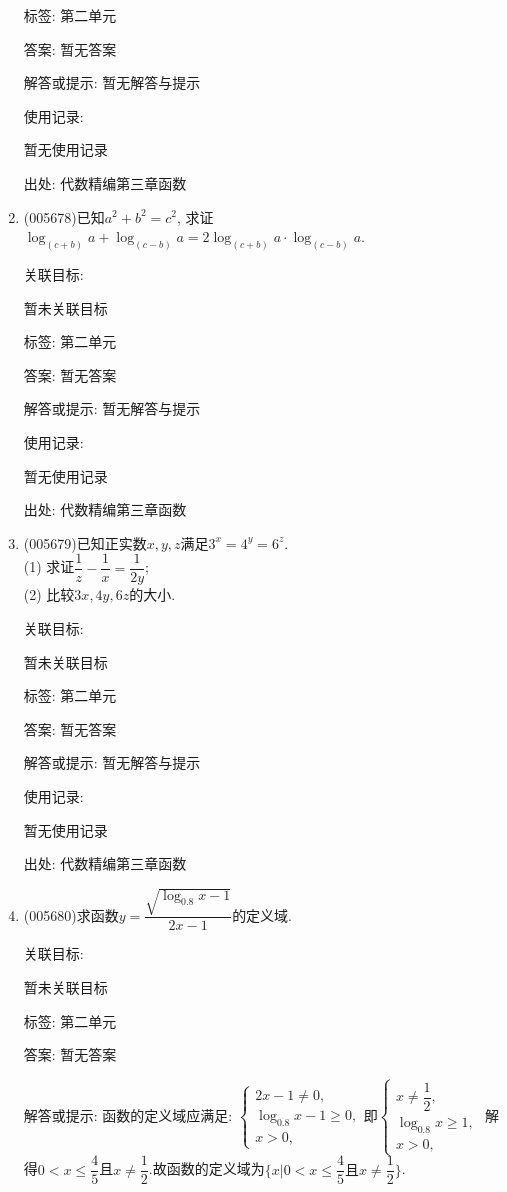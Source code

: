 \documentclass[10pt,a4paper]{article}
\begin{document}
\begin{enumerate}[1.]
标签: 第二单元

答案: 暂无答案

解答或提示: 暂无解答与提示

使用记录:

暂无使用记录


出处: 代数精编第三章函数
\item { (005678)}已知$a^2+b^2=c^2$, 求证$\log_{(c+b)}a+\log_{(c-b)}a=2\log_{(c+b)}a\cdot \log_{(c-b)}a$.


关联目标:

暂未关联目标



标签: 第二单元

答案: 暂无答案

解答或提示: 暂无解答与提示

使用记录:

暂无使用记录


出处: 代数精编第三章函数
\item { (005679)}已知正实数$x,y,z$满足$3^x=4^y=6^z$.\\
(1) 求证$\dfrac 1z-\dfrac 1x=\dfrac 1{2y}$;\\
(2) 比较$3x,4y,6z$的大小.


关联目标:

暂未关联目标



标签: 第二单元

答案: 暂无答案

解答或提示: 暂无解答与提示

使用记录:

暂无使用记录


出处: 代数精编第三章函数
\item { (005680)}求函数$y=\dfrac{\sqrt {\log_{0.8}x-1}}{2x-1}$的定义域.


关联目标:

暂未关联目标



标签: 第二单元

答案: 暂无答案

解答或提示: 函数的定义域应满足: $\begin{cases} 2x-1\ne 0, \\ \log_{0.8}x-1\ge 0, \\ x>0, \end{cases}$即$\begin{cases} x\ne \dfrac 12, \\ \log_{0.8}x\ge 1, \\ x>0, \end{cases}$
解得$0<x\le \dfrac 45$且$x\ne \dfrac 12$.故函数的定义域为$\{x|0<x\le \dfrac 45\text{且}x\ne \dfrac 12\}$.


\end{enumerate}
\end{document}
